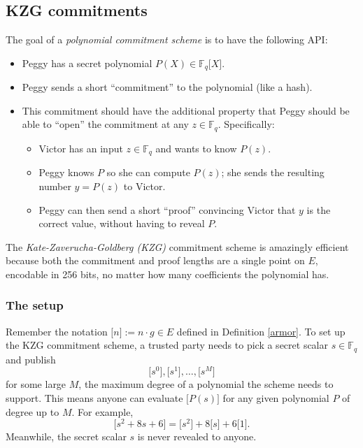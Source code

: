 \subsection{KZG commitments}\label{kzg}

The goal of a \emph{polynomial commitment scheme} is to have the
following API:

\begin{itemize}
\item
  Peggy has a secret polynomial
  \(P(X) \in \mathbb{F}_{q}\lbrack X\rbrack\).
\item
  Peggy sends a short ``commitment'' to the polynomial (like a hash).
\item
  This commitment should have the additional property that Peggy should
  be able to ``open'' the commitment at any \(z \in \mathbb{F}_{q}\).
  Specifically:

  \begin{itemize}
  \item
    Victor has an input \(z \in \mathbb{F}_{q}\) and wants to know
    \(P(z)\).
  \item
    Peggy knows \(P\) so she can compute \(P(z)\); she sends the
    resulting number \(y = P(z)\) to Victor.
  \item
    Peggy can then send a short ``proof'' convincing Victor that \(y\)
    is the correct value, without having to reveal \(P\).
  \end{itemize}
\end{itemize}

The \emph{Kate-Zaverucha-Goldberg (KZG)} commitment scheme is amazingly
efficient because both the commitment and proof lengths are a single
point on \(E\), encodable in 256 bits, no matter how many coefficients
the polynomial has.

\subsubsection{The setup}

Remember the notation \(\lbrack n\rbrack := n \cdot g \in E\) defined in
Definition \ref{armor}. To set up the KZG commitment scheme, a trusted party needs
to pick a secret scalar \(s \in \mathbb{F}_{q}\) and publish
\[\lbrack s^{0} \rbrack,\lbrack s^{1} \rbrack,\ldots,\lbrack s^{M} \rbrack\]
for some large \(M\), the maximum degree of a polynomial the scheme
needs to support. This means anyone can evaluate
\(\lbrack P(s) \rbrack\) for any given polynomial \(P\) of
degree up to \(M\). For example,
\[\lbrack s^{2} + 8s + 6 \rbrack = \lbrack s^{2} \rbrack + 8\lbrack s\rbrack + 6\lbrack 1\rbrack.\]
Meanwhile, the secret scalar \(s\) is never revealed to anyone.

